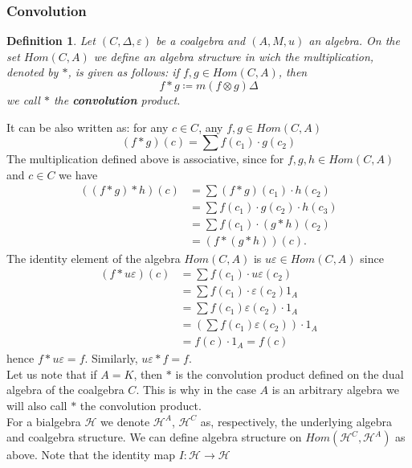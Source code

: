 \documentclass[a4paper, 12pt]{report}
\newtheorem{definition}{Definition}
\begin{document}
\subsubsection{Convolution}
\begin{definition}
Let $(C, \Delta, \varepsilon)$ be a coalgebra and $(A, M, u)$ an algebra. On the set $Hom(C, A)$ we define
an algebra structure in wich the multiplication, denoted by $*$, is given as follows: if
$f, g \in Hom(C, A)$, then
\begin{equation*}
f*g \coloneqq m(f \otimes g)\Delta
\end{equation*}
we call $*$ the \textbf{convolution} product.
\end{definition}
It can be also written as: for any $c \in C$, any $f, g \in Hom(C, A)$
\begin{equation*}
(f*g)(c) = \sum f(c_1) \cdot g(c_2)
\end{equation*}
The multiplication defined above is associative, since for $f, g, h \in Hom(C, A)$ and
$c \in C$ we have
\begin{align*}
((f*g)*h)(c) &= \sum(f*g)(c_1)\cdot h(c_2) \\
&= \sum f(c_1) \cdot g(c_2) \cdot h(c_3) \\
&= \sum f(c_1) \cdot (g*h)(c_2) \\
&= (f*(g*h))(c).
\end{align*}
The identity element of the algebra $Hom(C, A)$ is $u\varepsilon \in Hom(C, A)$ since
\begin{align*}
(f * u\varepsilon)(c) &= \sum f(c_1) \cdot u\varepsilon(c_2) \\
&= \sum f(c_1) \cdot \varepsilon(c_2)1_A \\
&= \sum f(c_1)\varepsilon(c_2) \cdot 1_A \\
&= \left(\sum f(c_1)\varepsilon(c_2)\right)\cdot 1_A \\
&= f(c) \cdot 1_A = f(c)
\end{align*}
hence $f * u\varepsilon = f$. Similarly, $u\varepsilon * f = f$. \\
Let us note that if $A = K$, then $*$ is the convolution product defined on the dual algebra of the
coalgebra $C$. This is why in the case $A$ is an arbitrary algebra we will also call $*$ the convolution
product. \\[8pt]
\indent For a bialgebra $\mathcal{H}$ we denote $\mathcal{H}^A$, $\mathcal{H}^C$ as, respectively,
the underlying algebra and coalgebra structure. We can define algebra structure on
$Hom(\mathcal{H}^C, \mathcal{H}^A)$ as above. Note that the identity map $I : \mathcal{H} \to \mathcal{H}$
\end{document}
